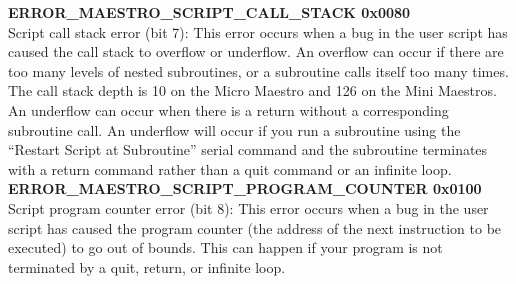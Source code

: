 \documentclass[letterpaper]{book}
\begin{document}
\textbf{ ERROR\_MAESTRO\_SCRIPT\_CALL\_STACK 0x0080}\\
Script call stack error (bit 7): This error occurs when a bug in the user script has caused the call stack to overflow or underflow. An overflow can occur if there are too many levels of nested subroutines, or a subroutine calls itself too many times. The call stack depth is 10 on the Micro Maestro and 126 on the Mini Maestros. An underflow can occur when there is a return without a corresponding subroutine call. An underflow will occur if you run a subroutine using the “Restart Script at Subroutine” serial command and the subroutine terminates with a return command rather than a quit command or an infinite loop.\\

\textbf{ ERROR\_MAESTRO\_SCRIPT\_PROGRAM\_COUNTER 0x0100}
Script program counter error (bit 8): This error occurs when a bug in the user script has caused the program counter (the address of the next instruction to be executed) to go out of bounds. This can happen if your program is not terminated by a quit, return, or infinite loop.
\end{document}

